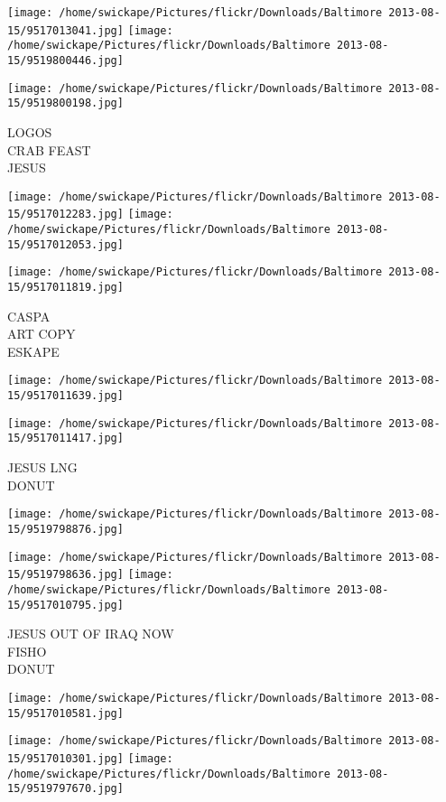 \documentclass[10pt,letterpaper]{article}
\begin{document}
\texttt{[image: /home/swickape/Pictures/flickr/Downloads/Baltimore 2013-08-15/9517013041.jpg]}
\texttt{[image: /home/swickape/Pictures/flickr/Downloads/Baltimore 2013-08-15/9519800446.jpg]}

\vspace{0.25in}
\texttt{[image: /home/swickape/Pictures/flickr/Downloads/Baltimore 2013-08-15/9519800198.jpg]}

LOGOS\\
CRAB FEAST\\
JESUS
\pagebreak

\texttt{[image: /home/swickape/Pictures/flickr/Downloads/Baltimore 2013-08-15/9517012283.jpg]}
\texttt{[image: /home/swickape/Pictures/flickr/Downloads/Baltimore 2013-08-15/9517012053.jpg]}

\texttt{[image: /home/swickape/Pictures/flickr/Downloads/Baltimore 2013-08-15/9517011819.jpg]}

CASPA\\
ART COPY\\
ESKAPE
\pagebreak

\texttt{[image: /home/swickape/Pictures/flickr/Downloads/Baltimore 2013-08-15/9517011639.jpg]}

\vspace{0.25in}
\texttt{[image: /home/swickape/Pictures/flickr/Downloads/Baltimore 2013-08-15/9517011417.jpg]}

JESUS LNG\\
DONUT
\pagebreak

\texttt{[image: /home/swickape/Pictures/flickr/Downloads/Baltimore 2013-08-15/9519798876.jpg]}

\vspace{0.25in}
\texttt{[image: /home/swickape/Pictures/flickr/Downloads/Baltimore 2013-08-15/9519798636.jpg]}
\texttt{[image: /home/swickape/Pictures/flickr/Downloads/Baltimore 2013-08-15/9517010795.jpg]}

JESUS OUT OF IRAQ NOW\\
FISHO\\
DONUT
\pagebreak

\texttt{[image: /home/swickape/Pictures/flickr/Downloads/Baltimore 2013-08-15/9517010581.jpg]}

\vspace{0.25in}
\texttt{[image: /home/swickape/Pictures/flickr/Downloads/Baltimore 2013-08-15/9517010301.jpg]}
\texttt{[image: /home/swickape/Pictures/flickr/Downloads/Baltimore 2013-08-15/9519797670.jpg]}
\end{document}
